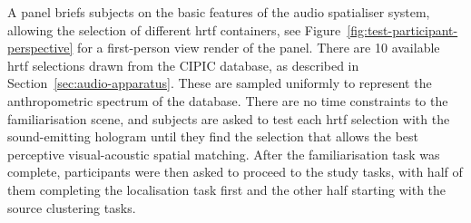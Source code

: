 A panel briefs subjects on the basic features of the audio spatialiser system, allowing the selection of different \acrshort{hrtf} containers, see Figure~\ref{fig:test-participant-perspective} for a first-person view render of the panel. There are 10 available \acrshort{hrtf} selections drawn from the CIPIC database, as described in Section~\ref{sec:audio-apparatus}. These are sampled uniformly to represent the anthropometric spectrum of the database. There are no time constraints to the familiarisation scene, and subjects are asked to test each \acrshort{hrtf} selection with the sound-emitting hologram until they find the selection that allows the best perceptive visual-acoustic spatial matching. After the familiarisation task was complete, participants were then asked to proceed to the study tasks, with half of them completing the localisation task first and the other half starting with the source clustering tasks.\par

